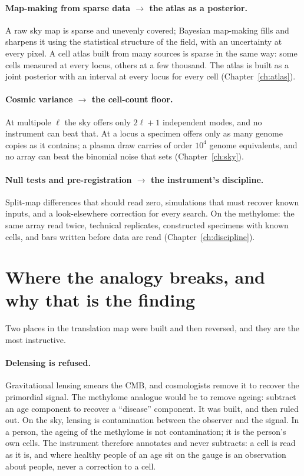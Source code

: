 \paragraph{Map-making from sparse data $\to$ the atlas as a posterior.} A raw sky map is sparse and unevenly covered;
Bayesian map-making fills and sharpens it using the statistical structure of the field, with an uncertainty at every pixel.
A cell atlas built from many sources is sparse in the same way: some cells measured at every locus, others at a few thousand.
The atlas is built as a joint posterior with an interval at every locus for every cell (Chapter~\ref{ch:atlas}).

\paragraph{Cosmic variance $\to$ the cell-count floor.} At multipole $\ell$ the sky offers only $2\ell+1$ independent modes, and
no instrument can beat that. At a locus a specimen offers only as many genome copies as it contains; a plasma draw carries of
order $10^4$ genome equivalents, and no array can beat the binomial noise that sets (Chapter~\ref{ch:sky}). \derived

\paragraph{Null tests and pre-registration $\to$ the instrument's discipline.} Split-map differences that should read zero,
simulations that must recover known inputs, and a look-elsewhere correction for every search. On the methylome: the same array
read twice, technical replicates, constructed specimens with known cells, and bars written before data are read
(Chapter~\ref{ch:discipline}).

\section{Where the analogy breaks, and why that is the finding}

Two places in the translation map were built and then reversed, and they are the most instructive.

\paragraph{Delensing is refused.} Gravitational lensing smears the CMB, and cosmologists remove it to recover the primordial
signal. The methylome analogue would be to remove ageing: subtract an age component to recover a ``disease'' component. It was
built, and then ruled out. On the sky, lensing is contamination between the observer and the signal. In a person, the ageing of
the methylome is not contamination; it is the person's own cells. The instrument therefore annotates and never subtracts: a cell
is read as it is, and where healthy people of an age sit on the gauge is an observation about people, never a correction to a
cell.

